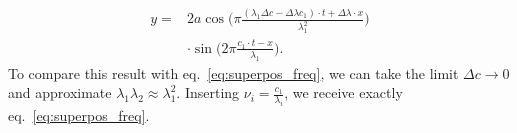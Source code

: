 \documentclass[a4paper,10pt,twocolumn]{article}
\begin{document}
    \begin{align}
        y=&2a\cos{\Big(\pi\frac{(\lambda_1\Delta c - \Delta\lambda c_1)\cdot t + \Delta\lambda\cdot x}{\lambda_1^2}\Big)}\nonumber\\&\cdot\sin{\Big(2\pi\frac{c_1\cdot t - x}{\lambda_1}\Big)}.
    \end{align}
    To compare this result with eq.~\ref{eq:superpos_freq}, we can take the limit $\Delta c \to 0$ and approximate $\lambda_1\lambda_2\approx\lambda_1^2$. Inserting $\nu_i=\frac{c_1}{\lambda_i}$, we receive exactly eq.~\ref{eq:superpos_freq}.
\end{document}
